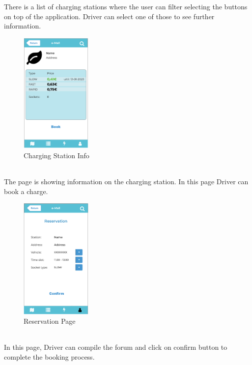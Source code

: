 \documentclass[../main.tex]{subfiles}
\begin{document}
There is a list of charging stations where the user can filter selecting the buttons on top of the application. Driver can select one of those to see further information.
\newpage
\begin{figure}[!htb]
  \centering
  \begin{minipage}[b]{\textwidth}
    \centering
    \includegraphics[width=35mm]{Mockups/mk_dv_csinfo.png}
    \caption{Charging Station Info}
    \label{fig:class}
  \end{minipage}
  \end{figure}\\
  \noindent
The page is showing information on the charging station. In this page Driver can book a charge.
  \begin{figure}[!htb]
  \centering
  \begin{minipage}[b]{\textwidth}
    \centering
    \includegraphics[width=35mm]{Mockups/mk_dv_book.png}
    \caption{Reservation Page}
    \label{fig:class}
  \end{minipage}
\end{figure}\\
In this page, Driver can compile the forum and click on confirm button to complete the booking process.
\newpage
\end{document}
